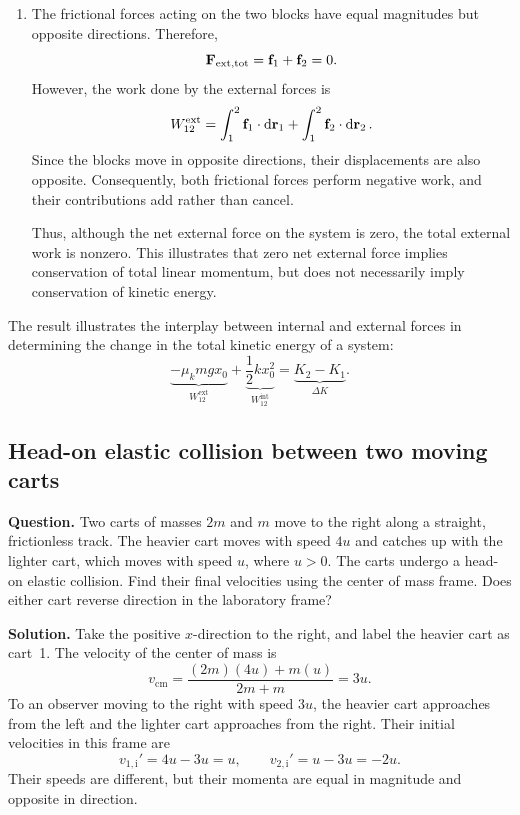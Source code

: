 \documentclass[12pt]{article}
\begin{document}
\begin{enumerate}
    \item The frictional forces acting on the two blocks have equal magnitudes but opposite directions. Therefore,
    \[
        \vb{F}_{\mathrm{ext,tot}}
        =\vb{f}_1+\vb{f}_2=0.
    \]
    However, the work done by the external forces is
    \[
        W_{12}^{\mathrm{ext}}
        =\int_1^2\vb{f}_1\cdot\dd{\vb{r}_1}
        +\int_1^2\vb{f}_2\cdot\dd{\vb{r}_2}.
    \]
    Since the blocks move in opposite directions, their displacements are also opposite. Consequently, both frictional forces perform negative work, and their contributions add rather than cancel.

    Thus, although the net external force on the system is zero, the total external work is nonzero. This illustrates that zero net external force implies conservation of total linear momentum, but does not necessarily imply conservation of kinetic energy.
\end{enumerate}

The result illustrates the interplay between internal and external forces in determining the change in the total kinetic energy of a system:
\[
    \boxed{
        \underbrace{-\mu_k mgx_0}_{W_{12}^{\mathrm{ext}}}
        +
        \underbrace{\frac{1}{2}kx_0^2}_{W_{12}^{\mathrm{int}}}
        =
        \underbrace{K_2-K_1}_{\Delta K}.
    }
\]

\subsection{Head-on elastic collision between two moving carts}

\textbf{Question.}
Two carts of masses $2m$ and $m$ move to the right along a straight, frictionless track. The heavier cart moves with speed $4u$ and catches up with the lighter cart, which moves with speed $u$, where $u>0$. The carts undergo a head-on elastic collision. Find their final velocities using the center of mass frame. Does either cart reverse direction in the laboratory frame?

\textbf{Solution.}
Take the positive $x$-direction to the right, and label the heavier cart as cart~1. The velocity of the center of mass is
\[
    v_{\text{cm}}
    = \frac{(2m)(4u)+m(u)}{2m+m}
    = 3u.
\]
To an observer moving to the right with speed $3u$, the heavier cart approaches from the left and the lighter cart approaches from the right. Their initial velocities in this frame are
\[
    v_{1,\text{i}}' = 4u-3u = u,
    \qquad
    v_{2,\text{i}}' = u-3u = -2u.
\]
Their speeds are different, but their momenta are equal in magnitude and opposite in direction.
\end{document}
